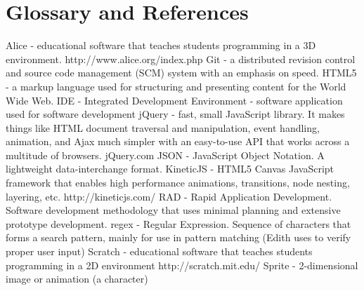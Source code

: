 \documentclass[a4paper]{article}
\begin{document}
\section{Glossary and References}
Alice - educational software that teaches students programming in a 3D environment. http://www.alice.org/index.php \newline \newline
Git - a distributed revision control and source code management (SCM) system with an emphasis on speed. \newline \newline
HTML5 - a markup language used for structuring and presenting content for the World Wide Web. \newline \newline
IDE - Integrated Development Environment - software application used for software development \newline \newline
jQuery - fast, small JavaScript library. It makes things like HTML document traversal and manipulation, event handling, animation, and Ajax much simpler with an easy-to-use API that works across a multitude of browsers. jQuery.com \newline \newline
JSON - JavaScript Object Notation. A lightweight data-interchange format. \newline \newline
KineticJS - HTML5 Canvas JavaScript framework that enables high performance animations, transitions, node nesting, layering, etc. http://kineticjs.com/ \newline \newline
RAD - Rapid Application Development. Software development methodology that uses minimal planning and extensive prototype development. \newline \newline
regex - Regular Expression. Sequence of characters that forms a search pattern, mainly for use in pattern matching (Edith uses to verify proper user input) \newline \newline
Scratch - educational software that teaches students programming in a 2D environment http://scratch.mit.edu/ \newline \newline
Sprite - 2-dimensional image or animation (a character) \newline \newline
\end{document}
